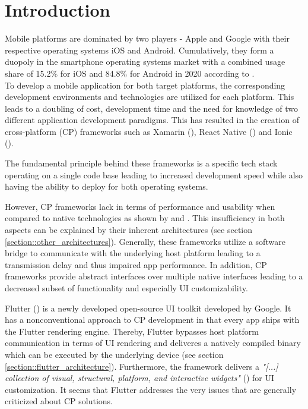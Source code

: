 \chapter{Introduction}
Mobile platforms are dominated by two players - Apple and Google with their respective operating systems iOS and Android. 
Cumulatively, they form a duopoly in the smartphone operating systems market with a combined usage share of 
15.2\% for iOS and 84.8\% for Android in 2020 according to \textcite{IDC2021}.
\\To develop a mobile application for both target platforms, the corresponding development environments and technologies 
are utilized for each platform. This leads to a doubling of cost, development time and 
the need for knowledge of two different application development paradigms. 
This has resulted in the creation of cross-platform (CP) frameworks such as Xamarin (\cite{Xamarin2021}), React Native (\cite{Facebook2021}) and Ionic (\cite{Ionic2021}). 

The fundamental principle behind these frameworks is a specific tech stack operating on a single code base leading to increased development speed
while also having the ability to deploy for both operating systems.

However, CP frameworks lack in terms of performance and 
usability when compared to native technologies as shown by \textcite{Mercado2016} and \textcite{Ebone2018}.
This insufficiency in both aspects can be explained by their inherent architectures (see section \ref{section::other_architectures}). 
Generally, these frameworks utilize a software bridge to communicate with the underlying host platform leading to a transmission delay and thus impaired
app performance. In addition, CP frameworks provide abstract interfaces over multiple native interfaces leading to a decreased subset of functionality
and especially UI customizability. 

Flutter (\cite{FlutterDev20}) is a newly developed open-source UI toolkit developed by Google. 
It has a nonconventional approach to CP development in that every app ships with the Flutter rendering engine. 
Thereby, Flutter bypasses host platform communication in terms of UI rendering and deliveres a natively compiled binary 
which can be executed by the underlying device (see section \ref{section::flutter_architecture}).
Furthermore, the framework delivers a \textit{"[...] collection of visual, structural, platform, and interactive widgets"} (\textcite{GoogleWidgets2021}) for UI customization.
It seems that Flutter addresses the very issues that are generally criticized about CP solutions.

